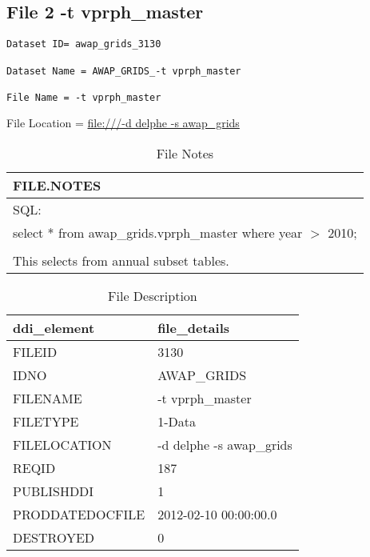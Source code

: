 \documentclass[a4paper]{article}
\begin{document}
\subsection{File 2 -t vprph\_master}

\begin{verbatim}
Dataset ID= awap_grids_3130

Dataset Name = AWAP_GRIDS_-t vprph_master

File Name = -t vprph_master
\end{verbatim}

\noindent File Location = \url{file:///-d delphe -s awap_grids}




 

\begin{table}[ht]
\begin{center}
\caption{File Notes}
\label{tab:tabx}
\begin{tabular}{p{10cm}}
  \hline
FILE.NOTES \\ 
  \hline
SQL: 
 \\ 
   select * from awap\_grids.vprph\_master where year $>$ 2010;
 \\ 
  
 \\ 
  This selects from annual subset tables. \\ 
   \hline
\end{tabular}
\end{center}
\end{table}
\begin{table}[ht]
\begin{center}
\caption{File Description}
\label{tab:tabx}
\begin{tabular}{p{4cm}p{9cm}}
  \hline
ddi\_element & file\_details \\ 
  \hline
FILEID & 3130 \\ 
  IDNO & AWAP\_GRIDS \\ 
  FILENAME & -t vprph\_master \\ 
  FILETYPE & 1-Data \\ 
  FILELOCATION & -d delphe -s awap\_grids \\ 
  REQID & 187 \\ 
  PUBLISHDDI & 1 \\ 
  PRODDATEDOCFILE & 2012-02-10 00:00:00.0 \\ 
  DESTROYED & 0 \\ 
   \hline
\end{tabular}
\end{center}
\end{table}
\end{document}

